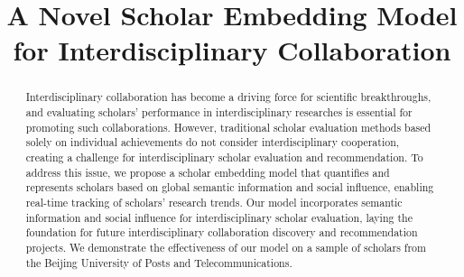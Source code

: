 \documentclass[conference]{IEEEtran}
\begin{document}
%
\title{A Novel Scholar Embedding Model for Interdisciplinary Collaboration}



\author{
}

\maketitle


\begin{abstract}
 Interdisciplinary collaboration has become a driving force for scientific breakthroughs, and evaluating scholars' performance in interdisciplinary researches is essential for promoting such collaborations. However, traditional scholar evaluation methods based solely on individual achievements do not consider interdisciplinary cooperation, creating a challenge for interdisciplinary scholar evaluation and recommendation. To address this issue, we propose a scholar embedding model that quantifies and represents scholars based on global semantic information and social influence, enabling real-time tracking of scholars' research trends. Our model incorporates semantic information and social influence for interdisciplinary scholar evaluation, laying the foundation for future interdisciplinary collaboration discovery and recommendation projects. We demonstrate the effectiveness of our model on a sample of scholars from the Beijing University of Posts and Telecommunications.
\end{abstract}
\end{document}
